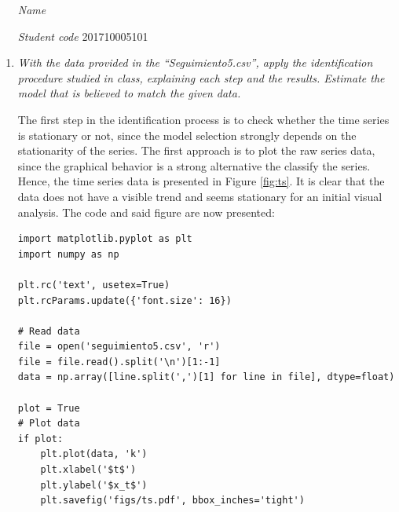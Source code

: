 \documentclass[fleqn]{article}
\begin{document}
 \vspace{0.3cm}
   \begin{itemize}[leftmargin=6.25cm, labelsep=0.5cm]

     \item[\textit{Name}]  %
     \item[\textit{Student code}] 201710005101 %

   \end{itemize}
\vspace{0.3cm}

\begin{enumerate}
\item \textit{With the data provided in the ``Seguimiento5.csv'', apply the identification procedure studied in class, explaining each step and the results. Estimate the model that is believed to match the given data.}

The first step in the identification process is to check whether the time series is stationary or not, since the model selection strongly depends on the stationarity of the series. The first approach is to plot the raw series data, since the graphical behavior is a strong alternative the classify the series. Hence, the time series data is presented in Figure \ref{fig:ts}. It is clear that the data does not have a visible trend and seems stationary for an initial visual analysis. The code and said figure are now presented:
\begin{verbatim}
import matplotlib.pyplot as plt
import numpy as np

plt.rc('text', usetex=True)
plt.rcParams.update({'font.size': 16})

# Read data
file = open('seguimiento5.csv', 'r')
file = file.read().split('\n')[1:-1]
data = np.array([line.split(',')[1] for line in file], dtype=float)

plot = True
# Plot data
if plot:
    plt.plot(data, 'k')
    plt.xlabel('$t$')
    plt.ylabel('$x_t$')
    plt.savefig('figs/ts.pdf', bbox_inches='tight')
\end{verbatim}


\end{enumerate}
\end{document}
